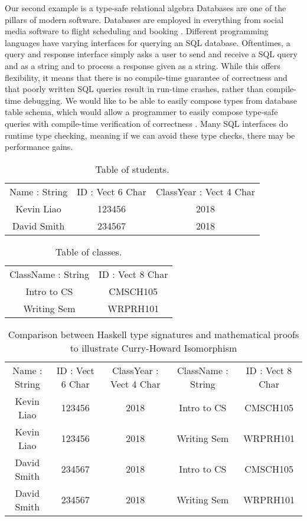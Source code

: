 Our second example is a type-safe relational algebra Databases are one of the pillars of modern software. Databases are employed in
everything from social media software \cite{tao} to flight scheduling and
booking \cite{flights}. Different programming languages have varying interfaces
for querying an SQL database. Oftentimes, a query and response interface simply
asks a user to send and receive a SQL query and as a string and to process a
response given as a string. While this offers flexibility, it means that there
is no compile-time guarantee of correctness and that poorly written SQL queries
result in run-time crashes, rather than compile-time debugging. We would like to
be able to easily compose types from database table schema, which would allow a
programmer to easily compose type-safe queries with compile-time verification of
correctness \cite{power_of_pi}. Many SQL interfaces do runtime type checking,
meaning if we can avoid these type checks, there may be performance gains. 

\begin{table}[h]
    \centering
    \begin{tabular}{|c|c|c|}
        Name : String & ID : Vect 6 Char & ClassYear : Vect 4 Char \\
        Kevin Liao    & 123456           & 2018                    \\
        David Smith   & 234567           & 2018
    \end{tabular}
    \caption{Table of students.}
    \label{students}
\end{table}

\begin{table}[h]
    \centering
    \begin{tabular}{|c|c|}
        ClassName : String & ID : Vect 8 Char\\
        Intro to CS        & CMSCH105        \\
        Writing Sem        & WRPRH101
    \end{tabular}
    \caption{Table of classes.}
    \label{classes}
\end{table}

\begin{table}[h]
    \centering
    \begin{tabular}{|c|c|c|c|c|}
        Name : String & ID : Vect 6 Char & ClassYear : Vect 4 Char & ClassName :
        String & ID : Vect 8 Char\\
        Kevin Liao    & 123456           & 2018       & Intro to CS & CMSCH105 \\
        Kevin Liao    & 123456           & 2018       & Writing Sem & WRPRH101 \\
        David Smith   & 234567           & 2018       & Intro to CS & CMSCH105 \\
        David Smith   & 234567           & 2018       & Writing Sem & WRPRH101 \\
    \end{tabular}
    \caption{Comparison between Haskell type signatures and mathematical proofs to illustrate Curry-Howard Isomorphism}
    \label{cartesian_product}
\end{table}

